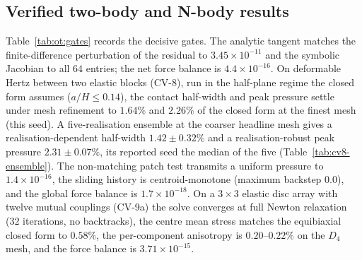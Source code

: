 \documentclass{svjour3}                 %
\begin{document}
\subsection{Verified two-body and N-body results}\label{app:ot:results}

Table~\ref{tab:ot:gates} records the decisive gates. The analytic tangent matches the finite-difference
perturbation of the residual to $3.45\times10^{-11}$ and the symbolic Jacobian to all $64$ entries; the net force
balance is $4.4\times10^{-16}$. On deformable Hertz between two elastic blocks (CV-8), run in the half-plane
regime the closed form assumes ($a/H\le0.14$), the contact half-width and peak pressure settle under mesh
refinement to $1.64\%$ and $2.26\%$ of the closed form at the finest mesh (this seed). A five-realisation
ensemble at the coarser headline mesh gives a realisation-dependent half-width $1.42\pm0.32\%$ and a
realisation-robust peak pressure $2.31\pm0.07\%$, its reported seed the median of the five
(Table~\ref{tab:cv8-ensemble}). The
non-matching patch test transmits a uniform pressure to $1.4\times10^{-16}$, the sliding history is
centroid-monotone (maximum backstep $0.0$), and the global force balance is $1.7\times10^{-18}$. On a $3\times3$
elastic disc array with twelve mutual couplings (CV-9a) the solve converges at full Newton relaxation (32
iterations, no backtracks), the centre mean stress matches the equibiaxial closed form to $0.58\%$, the
per-component anisotropy is $0.20$--$0.22\%$ on the $D_4$ mesh, and the force balance is $3.71\times10^{-15}$.
\end{document}
